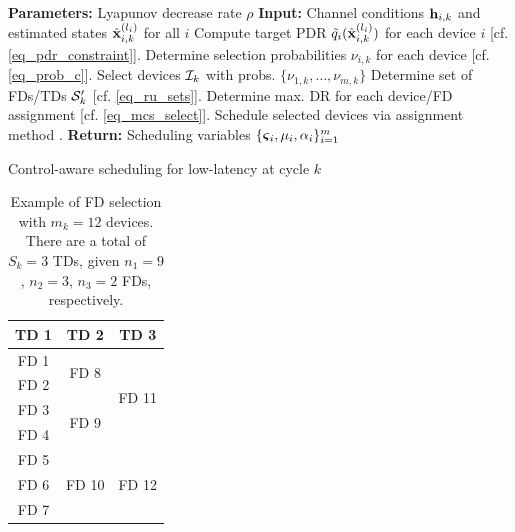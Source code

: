 {\linespread{1.3}
\begin{algorithm}[t] \begin{algorithmic}[1]
\STATE \textbf{Parameters:} Lyapunov decrease rate $\rho$
\STATE \textbf{Input:} Channel conditions ${\mathbf h}_{i,k}$ and estimated states ${\hat{\mathbf x} }^{(l_i)}_{i,k}$ for all $i$
\STATE Compute target PDR ${\tilde q}_i({\hat{\mathbf x} }^{(l_i)}_{i,k})$ for each device $i$ [cf. \eqref{eq_pdr_constraint}].
\STATE Determine selection probabilities $\nu_{i,k}$ for each device [cf. \eqref{eq_prob_c}].
\STATE Select devices ${\mathcal I}_k$ with probs. $\{\nu_{1,k},\hdots,\nu_{m,k}\}$
\STATE Determine set of FDs/TDs ${\mathcal S}'_k$ [cf. \eqref{eq_ru_sets}].
\STATE Determine max. DR for each device/FD assignment [cf. \eqref{eq_mcs_select}].
\STATE Schedule selected devices via assignment method \cite{kuhn1955hungarian}.
\STATE \textbf{Return:} Scheduling variables $\{\boldsymbol{\varsigma}_{i}, \mu_i, \alpha_i\}_{i=1}^m$ 
\end{algorithmic}
\caption{Control-aware scheduling for low-latency at cycle $k$}\label{alg_calls} \end{algorithm}}

\begin{table}[]
\centering
\begin{tabular}{|c|c|c|}
\hline 
\textbf{TD 1} & \textbf{TD 2} & \textbf{TD 3}        \\ \hline \hline
\multicolumn{1}{|c|}{FD 1} & \multicolumn{1}{c|}{\multirow{2}{*}{FD 8}} & \multicolumn{1}{c|}{\multirow{4}{*}{FD 11}} \\ \cline{1-1}
\multicolumn{1}{|c|}{FD 2} & \multicolumn{1}{c|}{}                       & \multicolumn{1}{c|}{}                       \\ \cline{1-2}
\multicolumn{1}{|c|}{FD 3} & \multicolumn{1}{c|}{\multirow{2}{*}{FD 9}} & \multicolumn{1}{c|}{}                       \\ \cline{1-1}
\multicolumn{1}{|c|}{FD 4} & \multicolumn{1}{c|}{}                       & \multicolumn{1}{c|}{}                       \\ \hline
\multicolumn{1}{|c|}{FD 5} & \multicolumn{1}{c|}{\multirow{4}{*}{FD 10}} & \multicolumn{1}{c|}{\multirow{4}{*}{FD 12}} \\ \cline{1-1}
\multicolumn{1}{|c|}{FD 6} & \multicolumn{1}{c|}{}                       & \multicolumn{1}{c|}{}                       \\ \cline{1-1}
\multicolumn{1}{|c|}{FD 7} & \multicolumn{1}{c|}{}                       & \multicolumn{1}{c|}{}                       \\ \cline{1-1} \hline
\end{tabular}
\caption{Example of FD selection with $m_k= 12$ devices. There are a total of $S_k = 3$ TDs, given $n_1=9$, $n_2 = 3$, $n_3 = 2$ FDs, respectively.}
\label{tab_rus}
\end{table}

